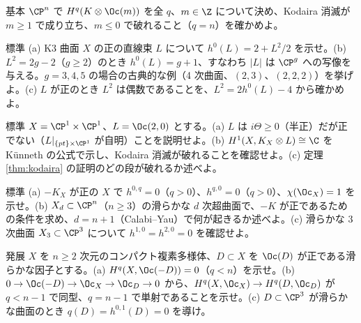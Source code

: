 \begin{prob}{基本}\label{p:KodairaPn}
$\CP^n$ で $H^q(K\otimes\Oc(m))$ を全 $q$、$m\in\Z$ について決め、Kodaira 消滅が $m\ge1$ で成り立ち、$m\le0$ で破れること（$q=n$）を確かめよ。
\end{prob}
\begin{prob}{標準}\label{p:K3h0}
(a) K3 曲面 $X$ の正の直線束 $L$ について $h^0(L)=2+L^2/2$ を示せ。(b) $L^2=2g-2$（$g\ge2$）のとき $h^0(L)=g+1$、すなわち $|L|$ は $\CP^g$ への写像を与える。$g=3,4,5$ の場合の古典的な例（4 次曲面、$(2,3)$、$(2,2,2)$）を挙げよ。(c) $L$ が正のとき $L^2$ は偶数であることを、$L^2=2h^0(L)-4$ から確かめよ。
\end{prob}
\begin{prob}{標準}\label{p:semipos}
$X=\CP^1\times\CP^1$、$L=\Oc(2,0)$ とする。(a) $L$ は $i\Theta\ge0$（半正）だが正でない（$L|_{\{pt\}\times\CP^1}$ が自明）ことを説明せよ。(b) $H^1(X,K_X\otimes L)\cong\C$ を Künneth の公式で示し、Kodaira 消滅が破れることを確認せよ。(c) 定理 \ref{thm:kodaira} の証明のどの段が破れるか述べよ。
\end{prob}
\begin{prob}{標準}\label{p:fano}
(a) $-K_X$ が正の $X$ で $h^{0,q}=0$（$q>0$）、$h^{q,0}=0$（$q>0$）、$\chi(\Oc_X)=1$ を示せ。(b) $X_d\subset\CP^{n}$（$n\ge3$）の滑らかな $d$ 次超曲面で、$-K$ が正であるための条件を求め、$d=n+1$（Calabi--Yau）で何が起きるか述べよ。(c) 滑らかな 3 次曲面 $X_3\subset\CP^3$ について $h^{1,0}=h^{2,0}=0$ を確認せよ。
\end{prob}
\begin{prob}{発展}\label{p:amplediv}
$X$ を $n\ge2$ 次元のコンパクト複素多様体、$D\subset X$ を $\Oc(D)$ が正である滑らかな因子とする。(a) $H^q(X,\Oc(-D))=0$（$q<n$）を示せ。(b) $0\to\Oc(-D)\to\Oc_X\to\Oc_D\to0$ から、$H^q(X,\Oc_X)\to H^q(D,\Oc_D)$ が $q<n-1$ で同型、$q=n-1$ で単射であることを示せ。(c) $D\subset\CP^3$ が滑らかな曲面のとき $q(D)=h^{0,1}(D)=0$ を導け。
\end{prob}

